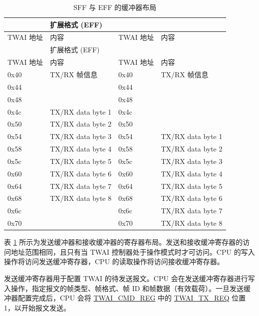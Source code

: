 \documentclass[main\_\_CN.tex]{subfiles}
\begin{document}
\begin{longtable}[c]{|p{2.5cm}|p{4cm}|p{2.5cm}|p{4cm}|}
\caption{SFF 与 EFF 的缓冲器布局}\label{Figure:TWAI_memory_box}
\\\hline
\rowcolor{lightgray}
\multicolumn{2}{|l|}{标准格式 (SFF)}&\multicolumn{2}{|l|}{扩展格式 (EFF)}\\\hline
\rowcolor{gray!25}
TWAI 地址 & 内容 & TWAI 地址 & 内容\\\hline
\endfirsthead
\hline
\rowcolor{lightgray}
\multicolumn{2}{|l|}{标准格式 (SFF)}&\multicolumn{2}{|l|}{扩展格式 (EFF)}\\\hline
\rowcolor{gray!25}
TWAI 地址 & 内容 & TWAI 地址 & 内容\\\hline
\endhead
\endfoot
0x40&TX/RX 帧信息 &0x40&TX/RX 帧信息\\\hline
0x44&\cellcolor{mycyan}{TX/RX identifier 1}&0x44&\cellcolor{mycyan}{TX/RX identifier 1}\\\hline
0x48&\cellcolor{mycyan}{TX/RX identifier 2}&0x48&\cellcolor{mycyan}{TX/RX identifier 2}\\\hline
0x4c&TX/RX data byte 1&0x4c&\cellcolor{mycyan}{TX/RX identifier 3}\\\hline
0x50&TX/RX data byte 2&0x50&\cellcolor{mycyan}{TX/RX identifier 4}\\\hline
0x54&TX/RX data byte 3&0x54&TX/RX data byte 1\\\hline
0x58&TX/RX data byte 4&0x58&TX/RX data byte 2\\\hline
0x5c&TX/RX data byte 5&0x5c&TX/RX data byte 3\\\hline
0x60&TX/RX data byte 6&0x60&TX/RX data byte 4\\\hline
0x64&TX/RX data byte 7&0x64&TX/RX data byte 5\\\hline
0x68&TX/RX data byte 8&0x68&TX/RX data byte 6\\\hline
0x6c&\cellcolor{yellow}{保留}&0x6c&TX/RX data byte 7\\\hline
0x70&\cellcolor{yellow}{保留}&0x70&TX/RX data byte 8\\\hline
\end{longtable}

表 \ref{Figure:TWAI_memory_box} 所示为发送缓冲器和接收缓冲器的寄存器布局。发送和接收缓冲寄存器的访问地址范围相同，且只有当 TWAI 控制器处于操作模式时才可访问。CPU 的写入操作将访问发送缓冲寄存器，CPU 的读取操作将访问接收缓冲寄存器。

发送缓冲寄存器用于配置 TWAI 的待发送报文。CPU 会在发送缓冲寄存器进行写入操作，指定报文的帧类型、帧格式、帧 ID 和帧数据（有效载荷）。一旦发送缓冲器配置完成后，CPU 会将 \hyperref[regdesc:TWAICMDREG]{TWAI\_CMD\_REG} 中的 \hyperref[fielddesc:TWAITXREQ]{TWAI\_TX\_REQ} 位置 1，以开始报文发送。
\end{document}
